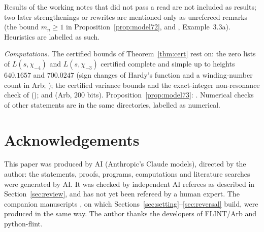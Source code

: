 Results of the working notes that did not pass a read are not included as results; two later strengthenings or rewrites are mentioned only as unrefereed remarks (the bound $m_n\ge1$ in Proposition~\ref{prop:model72}, and , Example~3.3a). Heuristics are labelled as such.

\emph{Computations.} The certified bounds of Theorem~\ref{thm:cert} rest on: the zero lists of $L(s,\chi_{-4})$ and $L(s,\chi_{-3})$ certified complete and simple up to heights $640.1657$ and $700.0247$ (sign changes of Hardy's function and a winding-number count in Arb; ); the certified variance bounds and the exact-integer non-resonance check of \cite{GO} (); and  (Arb, $200$ bits). Proposition~\ref{prop:model73}: . Numerical checks of other statements are in the same directories, labelled as numerical.

\section*{Acknowledgements}
This paper was produced by AI (Anthropic's Claude models), directed by the author: the statements, proofs, programs, computations and literature searches were generated by AI. It was checked by independent AI referees as described in Section~\ref{sec:review}, and has not yet been refereed by a human expert. The companion manuscripts \cite{GO,MC,WR}, on which Sections~\ref{sec:setting}--\ref{sec:reversal} build, were produced in the same way. The author thanks the developers of FLINT/Arb and python-flint.
